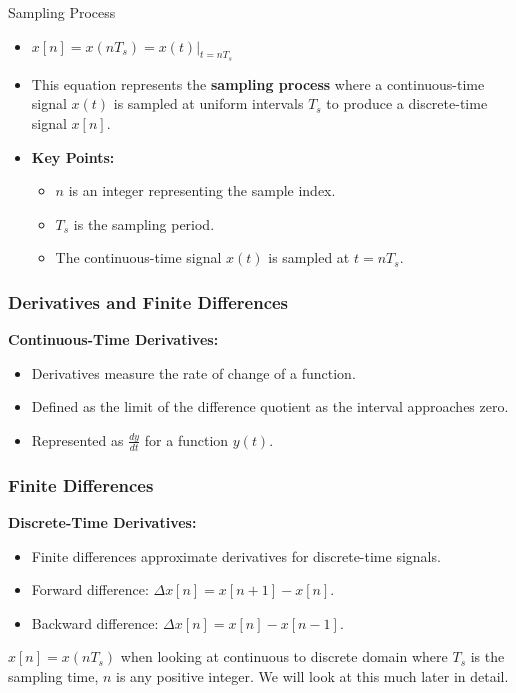\documentclass[aspectratio=169,xcolor=dvipsnames,svgnames,x11names,fleqn]{beamer}
\begin{document}
\begin{frame}{Sampling Process}
    \begin{itemize}
        \item \( x[n] = x(nT_s) = x(t)|_{t=nT_s} \)
        \item This equation represents the \textbf{sampling process} where a continuous-time signal \( x(t) \) is sampled at uniform intervals \( T_s \) to produce a discrete-time signal \( x[n] \).
        \item \textbf{Key Points:}
            \begin{itemize}
                \item \( n \) is an integer representing the sample index.
                \item \( T_s \) is the sampling period.
                \item The continuous-time signal \( x(t) \) is sampled at \( t = nT_s \).
            \end{itemize}
    \end{itemize}
\end{frame}

\begin{frame}
\frametitle{Derivatives and Finite Differences}
\textbf{Continuous-Time Derivatives:}
\begin{itemize}
    \item Derivatives measure the rate of change of a function.
    \item Defined as the limit of the difference quotient as the interval approaches zero.
    \item Represented as \( \frac{dy}{dt} \) for a function \( y(t) \).
\end{itemize}
\end{frame}

\begin{frame}
\frametitle{Finite Differences}
\textbf{Discrete-Time Derivatives:}
\begin{itemize}
    \item Finite differences approximate derivatives for discrete-time signals.
    \item Forward difference: \( \Delta x[n] = x[n+1] - x[n] \).
    \item Backward difference: \( \Delta x[n] = x[n] - x[n-1] \).
\end{itemize}
\vspace{5pt}
$x[n] = x(nT_s)$ when looking at continuous to discrete domain where $T_s$ is the sampling time, $n$ is any positive integer. We will look at this much later in detail.
\end{frame}
\end{document}
